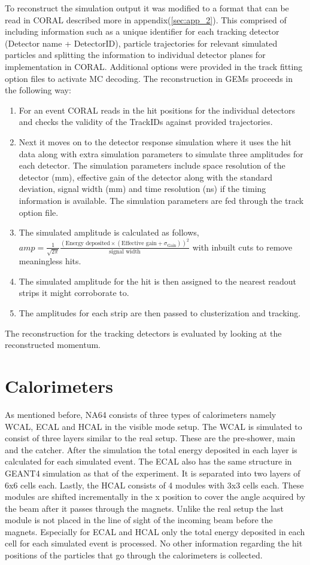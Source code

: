 To reconstruct the simulation output it was modified to a format that can be read in CORAL described more in appendix(\ref{sec:app_2}). This comprised of including information such as a unique identifier for each tracking detector (Detector name + DetectorID), particle trajectories for relevant simulated particles and splitting the information to individual detector planes for implementation in CORAL. Additional options were provided in the track fitting option files to activate MC decoding. The reconstruction in GEMs proceeds in the following way:
\begin{enumerate}
  \item For an event CORAL reads in the hit positions for the individual detectors and checks the validity of the TrackIDs against provided trajectories.
  \item Next it moves on to the detector response simulation where it uses the hit data along with extra simulation parameters to simulate three amplitudes for each detector. The simulation parameters include space resolution of the detector (mm), effective gain of the detector along with the standard deviation, signal width (mm) and time resolution (ns) if the timing information is available. The simulation parameters are fed through the track option file.
  \item The simulated amplitude is calculated as follows, $ amp = \frac{1}{\sqrt{2\pi}}\frac{(\text{Energy~deposited} \times (\text{Effective gain} + \sigma_{\text{Gain}}))^2}{\text{signal width}} $ with inbuilt cuts to remove meaningless hits.
  \item The simulated amplitude for the hit is then assigned to the nearest readout strips it might corroborate to.
  \item The amplitudes for each strip are then passed to clusterization and tracking.
\end{enumerate}
The reconstruction for the tracking detectors is evaluated by looking at the reconstructed momentum.

\section{Calorimeters}
 As mentioned before, NA64 consists of three types of calorimeters namely WCAL, ECAL and HCAL in the visible mode setup. The WCAL is simulated to consist of three layers similar to the real setup. These are the pre-shower, main and the catcher. After the simulation the total energy deposited in each layer is calculated for each simulated event. The ECAL also has the same structure in GEANT4 simulation as that of the experiment. It is separated into two layers of 6x6 cells each. Lastly, the HCAL consists of 4 modules with 3x3 cells each. These modules are shifted incrementally in the x position to cover the angle acquired by the beam after it passes through the magnets. Unlike the real setup the last module is not placed in the line of sight of the incoming beam before the magnets. Especially for ECAL and HCAL only the total energy deposited in each cell for each simulated event is processed. No other information regarding the hit positions of the particles that go through the calorimeters is collected.


